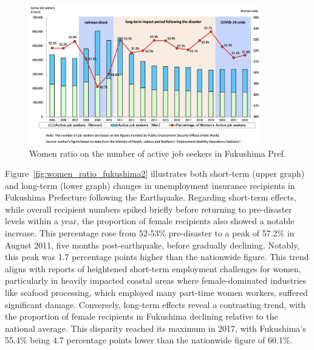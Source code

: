 \documentclass[a4paper,12pt]{article}
\begin{document}
\begin{figure}[h!]
    \centering
    \includegraphics[width=0.9\textwidth]{Women ratio on the number of active job seekers2}  %
    \caption{Women ratio on the number of active job seekers in Fukushima Pref.}
    \label{fig:women_ratio_fukushima}
\end{figure}

\clearpage

Figure~\ref{fig:women_ratio_fukushima2} illustrates both short-term (upper graph) and long-term (lower graph) changes in unemployment insurance recipients in Fukushima Prefecture following the Earthquake. Regarding short-term effects, while overall recipient numbers spiked briefly before returning to pre-disaster levels within a year, the proportion of female recipients also showed a notable increase. This percentage rose from 52-53\% pre-disaster to a peak of 57.2\% in August 2011, five months post-earthquake, before gradually declining. Notably, this peak was 1.7 percentage points higher than the nationwide figure. This trend aligns with reports of heightened short-term employment challenges for women, particularly in heavily impacted coastal areas where female-dominated industries like seafood processing, which employed many part-time women workers, suffered significant damage. Conversely, long-term effects reveal a contrasting trend, with the proportion of female recipients in Fukushima declining relative to the national average. This disparity reached its maximum in 2017, with Fukushima's 55.4\% being 4.7 percentage points lower than the nationwide figure of 60.1\%.
\end{document}
